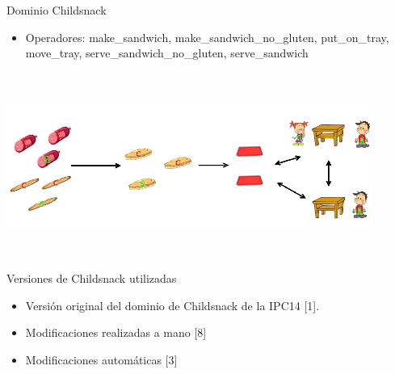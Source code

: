 \documentclass{beamer}
\begin{document}

\begin{frame}{Dominio Childsnack}
    \begin{itemize}
        \item Operadores: make\_sandwich, make\_sandwich\_no\_gluten, put\_on\_tray, move\_tray, serve\_sandwich\_no\_gluten, serve\_sandwich
    \end{itemize}

    \includegraphics[width=12cm,height=6cm]{childSnack}
\end{frame}


\begin{frame}{Versiones de Childsnack utilizadas}
    \begin{itemize}
        \item Versión original del dominio de Childsnack de la IPC14 [1].
        \item Modificaciones realizadas a mano [8]
        \item Modificaciones automáticas [3]
    \end{itemize}
\end{frame}

\end{document}
